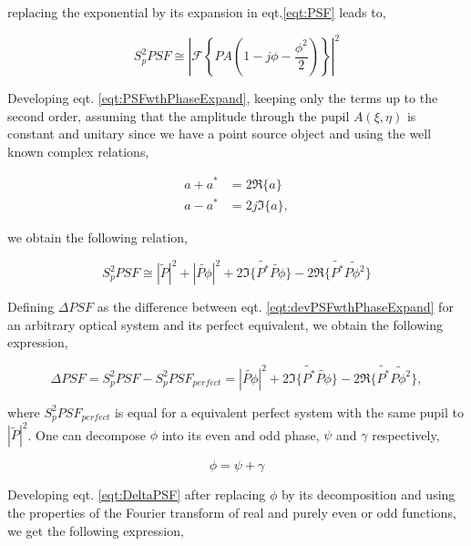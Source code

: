 replacing the exponential by its expansion in eqt.\eqref{eqt:PSF} leads to,

\begin{equation}
S_p^2 PSF \cong |\mathcal{F}\left\lbrace PA (1-j\phi-\frac{\phi^2}{2}) \right\rbrace|^2
\label{eqt:PSFwthPhaseExpand}
\end{equation}

Developing eqt. \eqref{eqt:PSFwthPhaseExpand}, keeping only the terms up to the second order, assuming that the amplitude through the pupil $A(\xi,\eta)$ is constant and unitary since we have a point source object and using the well known complex relations,

\begin{align}
a + a^* &= 2 \Re \lbrace a \rbrace \nonumber \\
a - a^* &= 2j \Im \lbrace a \rbrace, \nonumber
\end{align}

we obtain the following relation,

\begin{equation}
S_p^2 PSF \cong |\widetilde{P}|^2 + |\widetilde{P\phi}|^2 + 2\Im\lbrace \widetilde{P^*}\widetilde{P \phi}\rbrace - 2\Re\lbrace \widetilde{P^*}\widetilde{P \phi^2}\rbrace
\label{eqt:devPSFwthPhaseExpand}
\end{equation}

Defining $\Delta PSF$ as the difference between eqt. \eqref{eqt:devPSFwthPhaseExpand} for an arbitrary optical system and its perfect equivalent, we obtain the following expression,

\begin{equation}
\Delta PSF = S_p^2 PSF - S_p^2 PSF_{perfect} = |\widetilde{P\phi}|^2 + 2\Im\lbrace \widetilde{P^*}\widetilde{P \phi}\rbrace - 2\Re\lbrace \widetilde{P^*}\widetilde{P \phi^2}\rbrace,
\label{eqt:DeltaPSF}
\end{equation}

where $S_p^2 PSF_{perfect}$ is equal for a equivalent perfect system with the same pupil to $|\widetilde{P}|^2$. One can decompose $\phi$ into its even and odd phase, $\psi$ and $\gamma$ respectively,

\begin{equation}
\phi = \psi + \gamma
\label{eqt:Phidecomposed}
\end{equation}

Developing eqt. \eqref{eqt:DeltaPSF} after replacing $\phi$ by its decomposition and using the properties of the Fourier transform of real and purely even or odd functions, we get the following expression,

